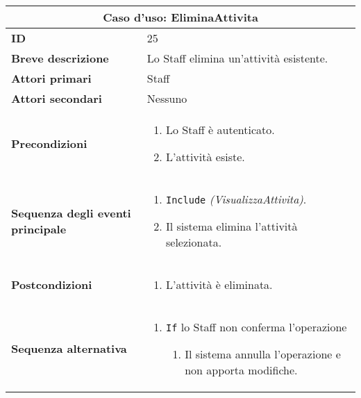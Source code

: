 \documentclass[a4paper]{report}
\begin{document}
\clearpage
\begin{table}[H]
\vspace*{-0cm}
\renewcommand{\arraystretch}{1.9}
\begin{tabular}{|p{3.9cm}|p{9.9cm}|}
\hline
\multicolumn{2}{|c|}{\textbf{Caso d’uso: EliminaAttivita}} \\ \hline
	\textbf{ID} & 25 \\ \hline
	\textbf{Breve descrizione} & Lo Staff elimina un’attività esistente. \\ \hline
	\textbf{Attori primari} & Staff \\ \hline
	\textbf{Attori secondari} & Nessuno \\ \hline
	\textbf{Precondizioni} & \begin{enumerate}[leftmargin=14pt,label=\arabic*.,labelsep=0.5em,topsep=0pt,partopsep=0pt,parsep=0pt,itemsep=0pt]
    \item Lo Staff è autenticato.
    \item L’attività esiste.
\end{enumerate} \\ \hline
	\textbf{Sequenza degli eventi principale} & \begin{enumerate}[leftmargin=14pt,label=\arabic*.,labelsep=0.5em,topsep=0pt,partopsep=0pt,parsep=0pt,itemsep=0pt]
    \item \texttt{Include} \textit{(VisualizzaAttivita)}.
    \item Il sistema elimina l’attività selezionata.
\end{enumerate} \\ \hline
	\textbf{Postcondizioni} & \begin{enumerate}[label=\arabic*.,leftmargin=14pt,labelsep=0.5em,topsep=0pt,partopsep=0pt,parsep=0pt,itemsep=0pt]
        \item L’attività è eliminata.
    \end{enumerate} \\ \hline
	\textbf{Sequenza alternativa} & \begin{enumerate}[leftmargin=14pt,label=\arabic*.,labelsep=0.5em,topsep=0pt,partopsep=0pt,parsep=0pt,itemsep=0pt]
    \item \texttt{If} lo Staff non conferma l’operazione
    \begin{enumerate}[label=\arabic{enumi}.\arabic*.,leftmargin=22pt,labelsep=0.5em,topsep=0pt,partopsep=0pt,parsep=0pt,itemsep=0pt]
        \item Il sistema annulla l’operazione e non apporta modifiche.
    \end{enumerate}
\end{enumerate} \\ \hline
\end{tabular}
\end{table}
\end{document}
